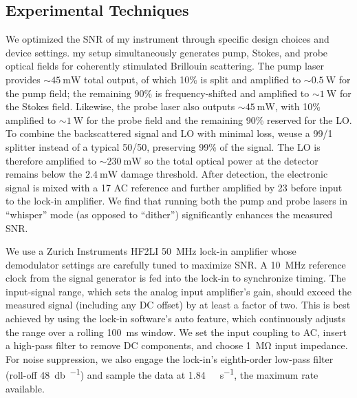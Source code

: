 \subsection{Experimental Techniques}
\label{Methods:Experimental Techniques}
We optimized the \ac{SNR} of my instrument through specific design choices and device settings. my setup simultaneously generates pump, Stokes, and probe optical fields for coherently stimulated Brillouin scattering. The pump laser provides \(\sim\!\SI{45}{\milli\watt}\) total output, of which 10\% is split and amplified to \(\sim\!\SI{0.5}{\watt}\) for the pump field; the remaining 90\% is frequency-shifted and amplified to \(\sim\!\SI{1}{\watt}\) for the Stokes field. Likewise, the probe laser also outputs \(\sim\!\SI{45}{\milli\watt}\), with 10\% amplified to \(\sim\!\SI{1}{\watt}\) for the probe field and the remaining 90\% reserved for the \ac{LO}. To combine the backscattered signal and \ac{LO} with minimal loss, weuse a 99/1 splitter instead of a typical 50/50, preserving 99\% of the signal. The \ac{LO} is therefore amplified to \(\sim\!\SI{230}{\milli\watt}\) so the total optical power at the detector remains below the \(\SI{2.4}{\milli\watt}\) damage threshold. After detection, the electronic signal is mixed with a \SI{17}{\dBm} \ac{AC} reference and further amplified by \SI{23}{\dBm} before input to the lock-in amplifier. We find that running both the pump and probe lasers in “whisper” mode (as opposed to “dither”) significantly enhances the measured SNR.

We use a Zurich Instruments HF2LI \SI{50}{\mega\hertz} lock-in amplifier whose demodulator settings are carefully tuned to maximize \ac{SNR}. A \SI{10}{\mega\hertz} reference clock from the signal generator is fed into the lock-in to synchronize timing. The input-signal range, which sets the analog input amplifier’s gain, should exceed the measured signal (including any \ac{DC} offset) by at least a factor of two. This is best achieved by using the lock-in software’s auto feature, which continuously adjusts the range over a rolling \SI{100}{\milli\second} window. We set the input coupling to \ac{AC}, insert a high-pass filter to remove \ac{DC} components, and choose \SI{1}{\mega\ohm} input impedance. For noise suppression, we also engage the lock-in’s eighth-order low-pass filter (roll-off \SI{48}{\decibel\per\octave}) and sample the data at \SI{1.84}{\mega\sample\per\second}, the maximum rate available.

